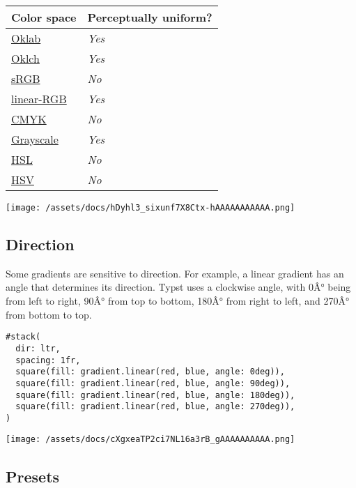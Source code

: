 \begin{longtable}[]{@{}ll@{}}
\toprule\noalign{}
Color space & Perceptually uniform? \\
\midrule\noalign{}
\endhead
\bottomrule\noalign{}
\endlastfoot
\href{/docs/reference/visualize/color/\#definitions-oklab}{Oklab} &
\emph{Yes} \\
\href{/docs/reference/visualize/color/\#definitions-oklch}{Oklch} &
\emph{Yes} \\
\href{/docs/reference/visualize/color/\#definitions-rgb}{sRGB} &
\emph{No} \\
\href{/docs/reference/visualize/color/\#definitions-linear-rgb}{linear-RGB}
& \emph{Yes} \\
\href{/docs/reference/visualize/color/\#definitions-cmyk}{CMYK} &
\emph{No} \\
\href{/docs/reference/visualize/color/\#definitions-luma}{Grayscale} &
\emph{Yes} \\
\href{/docs/reference/visualize/color/\#definitions-hsl}{HSL} &
\emph{No} \\
\href{/docs/reference/visualize/color/\#definitions-hsv}{HSV} &
\emph{No} \\
\end{longtable}

\texttt{[image: /assets/docs/hDyhl3\_sixunf7X8Ctx-hAAAAAAAAAAA.png]}

\subsection{Direction}\label{direction}

Some gradients are sensitive to direction. For example, a linear
gradient has an angle that determines its direction. Typst uses a
clockwise angle, with 0Â° being from left to right, 90Â° from top to
bottom, 180Â° from right to left, and 270Â° from bottom to top.

\begin{verbatim}
#stack(
  dir: ltr,
  spacing: 1fr,
  square(fill: gradient.linear(red, blue, angle: 0deg)),
  square(fill: gradient.linear(red, blue, angle: 90deg)),
  square(fill: gradient.linear(red, blue, angle: 180deg)),
  square(fill: gradient.linear(red, blue, angle: 270deg)),
)
\end{verbatim}

\texttt{[image: /assets/docs/cXgxeaTP2ci7NL16a3rB\_gAAAAAAAAAA.png]}

\subsection{Presets}\label{presets}

